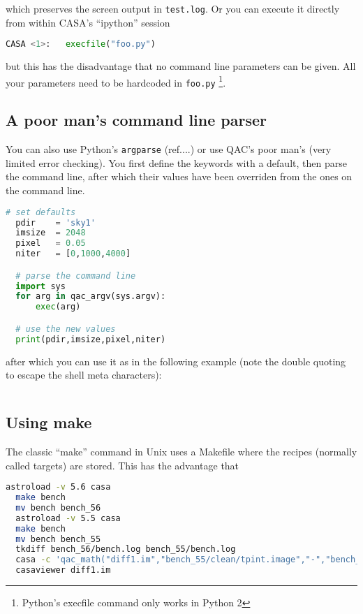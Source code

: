 \documentclass[12pt,a4paper]{article}
\begin{document}
which preserves the screen output in \verb+test.log+.  Or you can execute it directly from within CASA's ``ipython'' session

\begin{lstlisting}[language=Python]
CASA <1>:   execfile("foo.py")
\end{lstlisting}

but this has the disadvantage that no command line parameters can be given. All your parameters need to be hardcoded
in \verb+foo.py+ \footnote{Python's execfile command only works in Python 2}.

\subsection{A poor man's command line parser}

You can also use Python's {\tt argparse}   (ref....) or use QAC's poor man's (very limited error checking).  You first define
the keywords with a default, then parse the command line, after which their values have been overriden from the ones on
the command line.

\begin{lstlisting}[language=Python]
  # set defaults
  pdir    = 'sky1'
  imsize  = 2048
  pixel   = 0.05
  niter   = [0,1000,4000]

  # parse the command line
  import sys
  for arg in qac_argv(sys.argv):   
      exec(arg)

  # use the new values
  print(pdir,imsize,pixel,niter)

\end{lstlisting}

after which you can use it as in the following example (note the double quoting to escape the shell meta characters):

\begin{lstlisting}[language=bash]
  % casa --nogui -c foo.py pdir='"test1"' imsize=1024 pixel=0.1 niter='[0,1000]'  > test1.log 2>&1
\end{lstlisting}

\subsection{Using make}

The classic ``make'' command in Unix uses a Makefile where the recipes (normally called targets) are stored. This has the advantage that

\begin{lstlisting}[language=bash]
  astroload -v 5.6 casa
  make bench
  mv bench bench_56
  astroload -v 5.5 casa
  make bench
  mv bench bench_55
  tkdiff bench_56/bench.log bench_55/bench.log
  casa -c 'qac_math("diff1.im","bench_55/clean/tpint.image","-","bench_56/clean/tpint.image")'
  casaviewer diff1.im
\end{lstlisting}
\end{document}
